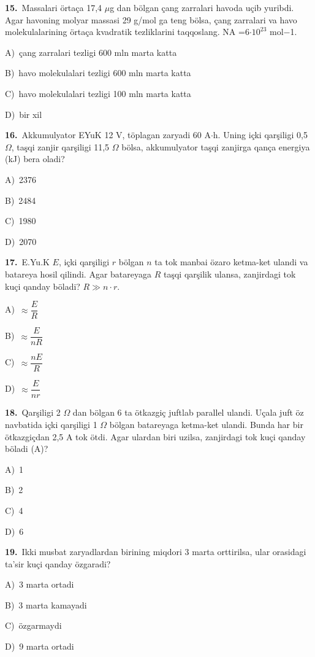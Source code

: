 \documentclass[11pt,a4paper]{article}
\newcommand{\opt}[2]{\hspace*{4mm}#1)\ #2\par}
\begin{document}
\noindent\begin{minipage}{\linewidth}
\textbf{15.}\ Massalari örtaça 17,4 $\mu$g dan bölgan çang zarralari havoda uçib yuribdi. Agar havoning molyar massasi 29 g/mol ga teng bölsa, çang zarralari va havo molekulalarining örtaça kvadratik tezliklarini taqqoslang. NA =6$\cdot10^{23}$ mol$-$1.\par\smallskip
\opt{A}{çang zarralari tezligi 600 mln marta katta}
\opt{B}{havo molekulalari tezligi 600 mln marta katta}
\opt{C}{havo molekulalari tezligi 100 mln marta katta}
\opt{D}{bir xil}
\end{minipage}\vspace{9pt}\par
\noindent\begin{minipage}{\linewidth}
\textbf{16.}\ Akkumulyator EYuK 12 V, töplagan zaryadi 60 A$\cdot$h. Uning içki qarşiligi 0,5 $\Omega$, taşqi zanjir qarşiligi 11,5 $\Omega$ bölsa, akkumulyator taşqi zanjirga qança energiya (kJ) bera oladi?\par\smallskip
\opt{A}{2376}
\opt{B}{2484}
\opt{C}{1980}
\opt{D}{2070}
\end{minipage}\vspace{9pt}\par
\noindent\begin{minipage}{\linewidth}
\textbf{17.}\ E.Yu.K $E$, içki qarşiligi $r$ bölgan $n$ ta tok manbai özaro ketma-ket ulandi va batareya hosil qilindi. Agar batareyaga $R$ taşqi qarşilik ulansa, zanjirdagi tok kuçi qanday böladi? $R\gg n\cdot r$.\par\smallskip
\opt{A}{$\approx\dfrac{E}{R}$}
\opt{B}{$\approx\dfrac{E}{nR}$}
\opt{C}{$\approx\dfrac{nE}{R}$}
\opt{D}{$\approx\dfrac{E}{nr}$}
\end{minipage}\vspace{9pt}\par
\noindent\begin{minipage}{\linewidth}
\textbf{18.}\ Qarşiligi 2 $\Omega$ dan bölgan 6 ta ötkazgiç juftlab parallel ulandi. Uçala juft öz navbatida içki qarşiligi 1 $\Omega$ bölgan batareyaga ketma-ket ulandi. Bunda har bir ötkazgiçdan 2,5 A tok ötdi. Agar ulardan biri uzilsa, zanjirdagi tok kuçi qanday böladi (A)?\par\smallskip
\opt{A}{1}
\opt{B}{2}
\opt{C}{4}
\opt{D}{6}
\end{minipage}\vspace{9pt}\par
\noindent\begin{minipage}{\linewidth}
\textbf{19.}\ Ikki musbat zaryadlardan birining miqdori 3 marta orttirilsa, ular orasidagi ta’sir kuçi qanday özgaradi?\par\smallskip
\opt{A}{3 marta ortadi}
\opt{B}{3 marta kamayadi}
\opt{C}{özgarmaydi}
\opt{D}{9 marta ortadi}
\end{minipage}\vspace{9pt}\par
\end{document}
